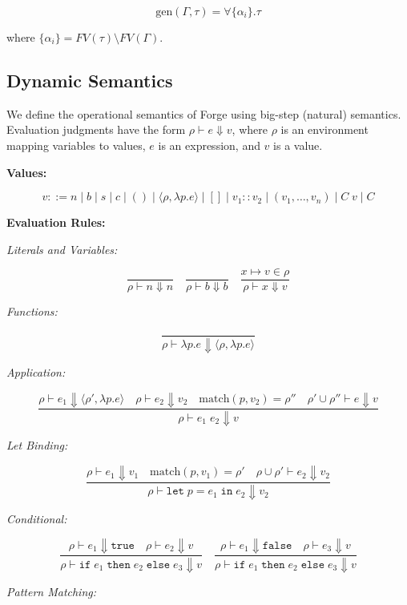 \documentclass[10pt,letterpaper,twocolumn]{article}
\begin{document}
$$\text{gen}(\Gamma, \tau) = \forall \{\alpha_i\}.\tau$$

where $\{\alpha_i\} = FV(\tau) \setminus FV(\Gamma)$.

\subsection{Dynamic Semantics}

We define the operational semantics of Forge using big-step (natural) semantics. Evaluation judgments have the form $\rho \vdash e \Downarrow v$, where $\rho$ is an environment mapping variables to values, $e$ is an expression, and $v$ is a value.

\textbf{Values:}

$$
v ::= n \mid b \mid s \mid c \mid () \mid \langle \rho, \lambda p.e \rangle \mid [] \mid v_1 :: v_2 \mid (v_1, \ldots, v_n) \mid C\;v \mid C
$$

\textbf{Evaluation Rules:}

\textit{Literals and Variables:}

$$
\frac{}{\rho \vdash n \Downarrow n}
\quad
\frac{}{\rho \vdash b \Downarrow b}
\quad
\frac{x \mapsto v \in \rho}{\rho \vdash x \Downarrow v}
$$

\textit{Functions:}

$$
\frac{}{\rho \vdash \lambda p.e \Downarrow \langle \rho, \lambda p.e \rangle}
$$

\textit{Application:}

$$
\frac{\rho \vdash e_1 \Downarrow \langle \rho', \lambda p.e \rangle \quad \rho \vdash e_2 \Downarrow v_2 \quad \text{match}(p, v_2) = \rho'' \quad \rho' \cup \rho'' \vdash e \Downarrow v}{\rho \vdash e_1\;e_2 \Downarrow v}
$$

\textit{Let Binding:}

$$
\frac{\rho \vdash e_1 \Downarrow v_1 \quad \text{match}(p, v_1) = \rho' \quad \rho \cup \rho' \vdash e_2 \Downarrow v_2}{\rho \vdash \texttt{let}\;p = e_1\;\texttt{in}\;e_2 \Downarrow v_2}
$$

\textit{Conditional:}

$$
\frac{\rho \vdash e_1 \Downarrow \texttt{true} \quad \rho \vdash e_2 \Downarrow v}{\rho \vdash \texttt{if}\;e_1\;\texttt{then}\;e_2\;\texttt{else}\;e_3 \Downarrow v}
\quad
\frac{\rho \vdash e_1 \Downarrow \texttt{false} \quad \rho \vdash e_3 \Downarrow v}{\rho \vdash \texttt{if}\;e_1\;\texttt{then}\;e_2\;\texttt{else}\;e_3 \Downarrow v}
$$

\textit{Pattern Matching:}
\end{document}

